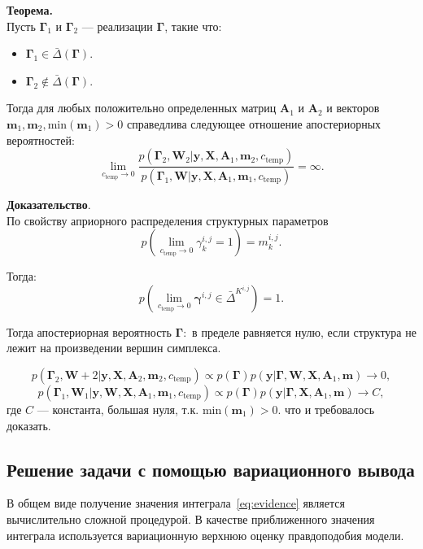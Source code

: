 \textbf{Теорема.} \\
Пусть $\boldsymbol{\Gamma}_1$ и $\boldsymbol{\Gamma}_2$ --- реализации $\boldsymbol{\Gamma}$, такие что:
\begin{itemize}
\item $\boldsymbol{\Gamma}_1 \in \bar{\Delta}(\boldsymbol{\Gamma})$.
\item $\boldsymbol{\Gamma}_2 \not \in \bar{\Delta}(\boldsymbol{\Gamma})$.
\end{itemize} 
Тогда для любых положительно определенных матриц $\mathbf{A}_1$ и $\mathbf{A}_2$ и векторов $\mathbf{m}_1, \mathbf{m}_2, \text{min}(\mathbf{m}_1)>0$ справедлива следующее отношение апостериорных вероятностей:
$$\lim_{c_\text{temp} \to 0} \frac{p(\boldsymbol{\Gamma}_2, \mathbf{W}_2|\mathbf{y},  \mathbf{X},\mathbf{A}_1,\mathbf{m}_2, {c_\text{temp}})}{p(\boldsymbol{\Gamma}_1,  \mathbf{W}|\mathbf{y}, \mathbf{X},\mathbf{A}_1,\mathbf{m}_1, {c_\text{temp}})} = \infty.$$

\textbf{Доказательство}.\\
По свойству априорного распределения структурных параметров
$$p(\lim_{c_{\text{temp}} \to 0} {\gamma}^{i,j}_k  = 1) = {m}^{i,j}_k.$$

Тогда:
$$p(\lim_{c_{\text{temp}} \to 0} \boldsymbol{\gamma}^{i,j} \in \bar{\Delta}^{K^{i,j}}) = 1.$$

Тогда апостериорная вероятность $\boldsymbol{\Gamma}:$ в пределе равняется нулю, если структура не лежит на произведении вершин симплекса.

$$p(\boldsymbol{\Gamma}_2, \mathbf{W}+2|\mathbf{y}, \mathbf{X},\mathbf{A}_2,\mathbf{m}_2, {c_\text{temp}}) \propto p(\boldsymbol{\Gamma}) p(\mathbf{y} |\boldsymbol{\Gamma},   \mathbf{W}, \mathbf{X},\mathbf{A}_1,\mathbf{m}) \to 0,$$
$$p(\boldsymbol{\Gamma}_1,  \mathbf{W}_1|\mathbf{y}, \mathbf{W}, \mathbf{X},\mathbf{A}_1,\mathbf{m}_1, {c_\text{temp}}) \propto p(\boldsymbol{\Gamma}) p(\mathbf{y} |\boldsymbol{\Gamma},  \mathbf{X},\mathbf{A}_1,\mathbf{m}) \to C,$$
где $C$ --- константа, большая нуля, т.к. $ \text{min}(\mathbf{m}_1)>0$.
что и требовалось доказать.

\subsection{Решение задачи с помощью вариационного вывода}
В общем виде получение значения интеграла~\eqref{eq:evidence} является вычислительно сложной процедурой. В качестве приближенного значения интеграла используется вариационную верхнюю оценку правдоподобия модели. 

